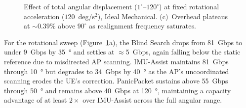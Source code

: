 \documentclass[fleqn,10pt]{wlscirep}
\newcommand{\legline}[2]{%
    \tikz[Blind Search=-0.5ex]{
        \draw[#1, #2, line width=1.5pt] (0,0) -- (0.5,0);
    }%
}
\begin{document}
\begin{figure}[ht!]
    \caption{Effect of total angular displacement ($1^\circ$--$120^\circ$) at fixed rotational acceleration ($120$~deg/s$^2$), Ideal Mechanical. (c)~Overhead plateaus at ${\sim}0.39\%$ above $90^\circ$ as realignment frequency saturates.}
    \label{fig:angle_effects}
    \vspace{-5pt}
\end{figure}

For the rotational sweep (Figure~\ref{fig:angle_effects}a), the Blind Search drops from \SI{81}{Gbps} to under \SI{9}{Gbps} by \SI{35}{\degree} and settles at $\approx$\SI{5}{Gbps}, again falling below the static reference due to misdirected AP scanning. IMU-Assist maintains \SI{81}{Gbps} through \SI{10}{\degree} but degrades to \SI{34}{Gbps} by \SI{40}{\degree} as the AP's uncoordinated scanning erodes the UE's correction. PanicPacket sustains above \SI{55}{Gbps} through \SI{50}{\degree} and remains above \SI{40}{Gbps} at \SI{120}{\degree}, maintaining a capacity advantage of at least $2\times$ over IMU-Assist across the full angular range.
\end{document}

